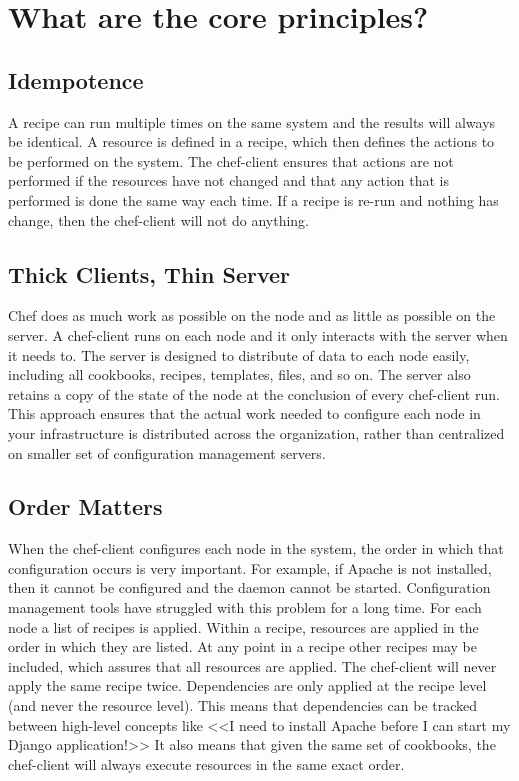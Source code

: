 \section{What are the core principles?}
\label{sec:what-principles}

\subsection{Idempotence}

A recipe can run multiple times on the same system and the results will always be identical. A resource is defined in a recipe, which then defines the actions to be performed on the system. The chef-client ensures that actions are not performed if the resources have not changed and that any action that is performed is done the same way each time. If a recipe is re-run and nothing has change, then the chef-client will not do anything.

\subsection{Thick Clients, Thin Server}

Chef does as much work as possible on the node and as little as possible on the server. A chef-client runs on each node and it only interacts with the server when it needs to. The server is designed to distribute of data to each node easily, including all cookbooks, recipes, templates, files, and so on. The server also retains a copy of the state of the node at the conclusion of every chef-client run. This approach ensures that the actual work needed to configure each node in your infrastructure is distributed across the organization, rather than centralized on smaller set of configuration management servers.

\subsection{Order Matters}

When the chef-client configures each node in the system, the order in which that configuration occurs is very important. For example, if Apache is not installed, then it cannot be configured and the daemon cannot be started. Configuration management tools have struggled with this problem for a long time. For each node a list of recipes is applied. Within a recipe, resources are applied in the order in which they are listed. At any point in a recipe other recipes may be included, which assures that all resources are applied. The chef-client will never apply the same recipe twice. Dependencies are only applied at the recipe level (and never the resource level). This means that dependencies can be tracked between high-level concepts like <<I need to install Apache before I can start my Django application!>> It also means that given the same set of cookbooks, the chef-client will always execute resources in the same exact order.
